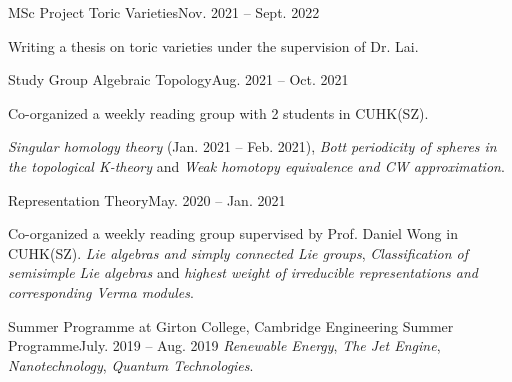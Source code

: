 \resumeSubHeadingListStart
	\resumeSubheading
		{MSc Project}{}
		{Toric Varieties}{Nov. 2021 -- Sept. 2022}
		\resumeItemListStart
			\item{Writing a thesis on toric varieties under the supervision of Dr. Lai.} %
		\resumeItemListEnd

	\resumeSubheading
		{Study Group}{}
		{Algebraic Topology}{Aug. 2021 -- Oct. 2021}
		\resumeItemListStart
			\item Co-organized a weekly reading group with 2 students in CUHK(SZ). \par
				{\textit{Singular homology theory} (Jan. 2021 -- Feb. 2021), \textit{Bott periodicity of spheres in the topological K-theory} and \textit{Weak homotopy equivalence and CW approximation}.}
		\resumeItemListEnd
		
		\resumeSubSubheading
			{Representation Theory}{May. 2020 -- Jan. 2021}
			\resumeItemListStart
				\item Co-organized a weekly reading group supervised by Prof. Daniel Wong in CUHK(SZ).
					{\textit{Lie algebras and simply connected Lie groups}, \textit{Classification of semisimple Lie algebras} and \textit{highest weight of irreducible representations and corresponding Verma modules}.}
			\resumeItemListEnd

	\resumeSubheading
		{Summer Programme at Girton College, Cambridge}{}
		{Engineering Summer Programme}{July. 2019 -- Aug. 2019}
		\resumeItemListStart
				{\textit{Renewable Energy}, \textit{The Jet Engine}, \textit{Nanotechnology}, \textit{Quantum Technologies}.}
		\resumeItemListEnd
		
\resumeSubHeadingListEnd

